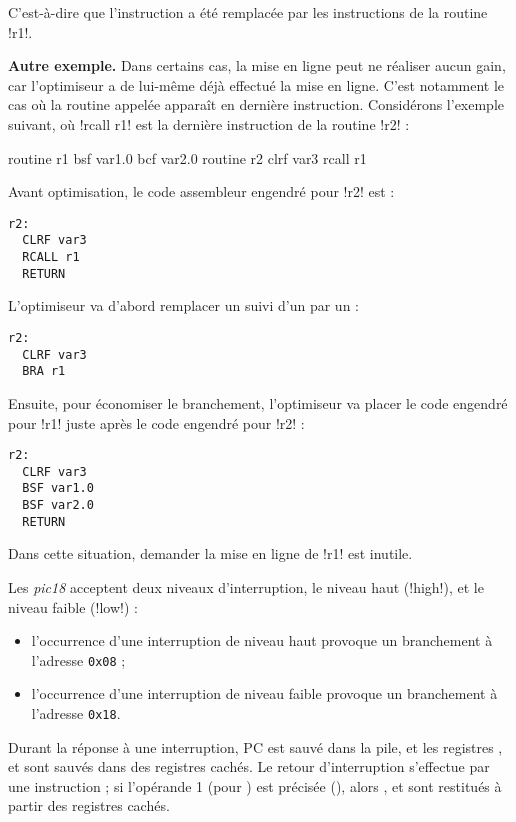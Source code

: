 C'est-à-dire que l'instruction  a été remplacée par les instructions de la routine \pic!r1!.

\textbf{Autre exemple.} Dans certains cas, la mise en ligne peut ne réaliser aucun gain, car l'optimiseur a de lui-même déjà effectué la mise en ligne. C'est notamment le cas où la routine appelée apparaît en dernière instruction. Considérons l'exemple suivant, où \pic!rcall r1! est la dernière instruction de la routine \pic!r2! :
\begin{piccolo}
routine r1 {
  bsf var1.0
  bcf var2.0
}
routine r2 {
  clrf var3
  rcall r1
}
\end{piccolo}

Avant optimisation, le code assembleur engendré pour \pic!r2! est :
\begin{lstlisting}[language=assembleur]
r2:
  CLRF var3
  RCALL r1
  RETURN
\end{lstlisting}

L'optimiseur va d'abord remplacer un  suivi d'un  par un  :
\begin{lstlisting}[language=assembleur]
r2:
  CLRF var3
  BRA r1
\end{lstlisting}

Ensuite, pour économiser le branchement, l'optimiseur va placer le code engendré pour \pic!r1! juste après le code engendré pour \pic!r2! :
\begin{lstlisting}[language=assembleur]
r2:
  CLRF var3
  BSF var1.0
  BSF var2.0
  RETURN
\end{lstlisting}

Dans cette situation, demander la mise en ligne de \pic!r1! est inutile.






Les \emph{pic18} acceptent deux niveaux d’interruption, le niveau haut (\pic!high!), et le niveau faible (\pic!low!) :
\begin{itemize}
  \item l’occurrence d’une interruption de niveau haut provoque un branchement à l’adresse \texttt{0x08} ;
  \item l’occurrence d’une interruption de niveau faible provoque un branchement à l’adresse \texttt{0x18}.
\end{itemize}

Durant la réponse à une interruption, PC est sauvé dans la pile, et les registres ,  et  sont sauvés dans des registres cachés. Le retour d’interruption s’effectue par une instruction  ; si l’opérande 1 (pour ) est précisée (), alors ,  et  sont restitués à partir des registres cachés.

